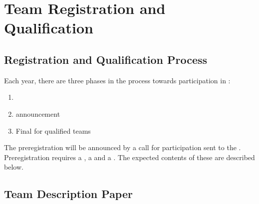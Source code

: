 \section{Team Registration and Qualification}


\subsection{Registration and Qualification Process}
\label{rule:participation}

Each year, there are three phases in the process towards participation in \AtHome:
\begin{enumerate}
	\item {}
	\item {} announcement
	\item Final  for qualified teams
\end{enumerate}
The preregistration will be announced by a call for participation sent to the .
Preregistration requires a , a  and a .
The expected contents of these are described below.

\subsection{Team Description Paper}
\label{rule:website_tdp}

